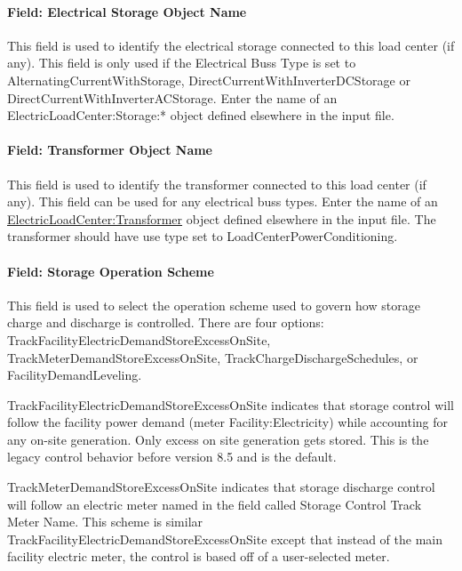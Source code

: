 \paragraph{Field: Electrical Storage Object Name}\label{field-electrical-storage-object-name}

This field is used to identify the electrical storage connected to this load center (if any). This field is only used if the Electrical Buss Type is set to AlternatingCurrentWithStorage, DirectCurrentWithInverterDCStorage or DirectCurrentWithInverterACStorage. Enter the name of an ElectricLoadCenter:Storage:* object defined elsewhere in the input file.

\paragraph{Field: Transformer Object Name}\label{field-transformer-object-name}

This field is used to identify the transformer connected to this load center (if any). This field can be used for any electrical buss types. Enter the name of an \hyperref[electricloadcentertransformer]{ElectricLoadCenter:Transformer} object defined elsewhere in the input file. The transformer should have use type set to LoadCenterPowerConditioning.

\paragraph{Field: Storage Operation Scheme}\label{field-storage-operation-scheme}

This field is used to select the operation scheme used to govern how storage charge and discharge is controlled. There are four options: TrackFacilityElectricDemandStoreExcessOnSite, TrackMeterDemandStoreExcessOnSite, TrackChargeDischargeSchedules, or FacilityDemandLeveling.

TrackFacilityElectricDemandStoreExcessOnSite indicates that storage control will follow the facility power demand (meter Facility:Electricity) while accounting for any on-site generation. Only excess on site generation gets stored. This is the legacy control behavior before version 8.5 and is the default.

TrackMeterDemandStoreExcessOnSite indicates that storage discharge control will follow an electric meter named in the field called Storage Control Track Meter Name. This scheme is similar TrackFacilityElectricDemandStoreExcessOnSite except that instead of the main facility electric meter, the control is based off of a user-selected meter.

